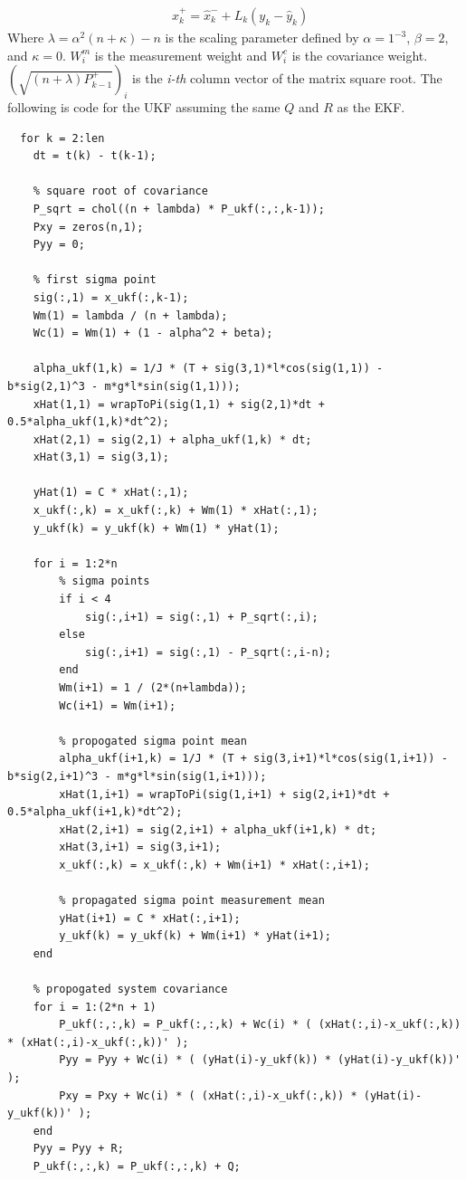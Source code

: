 \documentclass[10pt]{article}
\begin{document}
\begin{enumerate}[label=\textbf{\arabic*.}]
\begin{equation}
\begin{split}
      &\hat{x}_k^+ = \hat{x}_k^- + L_k(y_k - \hat{y}_k)
    \end{split}
    \label{eq:4}
  \end{equation}
  Where $\lambda=\alpha^2(n+\kappa) - n$ is the scaling parameter defined by 
  $\alpha=1^{-3}$, $\beta=2$, and $\kappa=0$. $W_i^{m}$ is the measurement 
  weight and $W_i^{c}$ is the covariance weight. $(\sqrt{(n+\lambda)P_{k-1}^+})_i$ 
  is the \emph{i-th} column vector of the matrix square root. The following is 
  code for the UKF assuming the same $Q$ and $R$ as the EKF.
  \begin{lstlisting}
  for k = 2:len
    dt = t(k) - t(k-1);

    % square root of covariance
    P_sqrt = chol((n + lambda) * P_ukf(:,:,k-1));
    Pxy = zeros(n,1);
    Pyy = 0;

    % first sigma point
    sig(:,1) = x_ukf(:,k-1);
    Wm(1) = lambda / (n + lambda);
    Wc(1) = Wm(1) + (1 - alpha^2 + beta);

    alpha_ukf(1,k) = 1/J * (T + sig(3,1)*l*cos(sig(1,1)) - b*sig(2,1)^3 - m*g*l*sin(sig(1,1)));
    xHat(1,1) = wrapToPi(sig(1,1) + sig(2,1)*dt + 0.5*alpha_ukf(1,k)*dt^2);
    xHat(2,1) = sig(2,1) + alpha_ukf(1,k) * dt;
    xHat(3,1) = sig(3,1);

    yHat(1) = C * xHat(:,1);
    x_ukf(:,k) = x_ukf(:,k) + Wm(1) * xHat(:,1);
    y_ukf(k) = y_ukf(k) + Wm(1) * yHat(1);

    for i = 1:2*n
        % sigma points
        if i < 4
            sig(:,i+1) = sig(:,1) + P_sqrt(:,i);
        else
            sig(:,i+1) = sig(:,1) - P_sqrt(:,i-n);
        end
        Wm(i+1) = 1 / (2*(n+lambda));
        Wc(i+1) = Wm(i+1);

        % propogated sigma point mean
        alpha_ukf(i+1,k) = 1/J * (T + sig(3,i+1)*l*cos(sig(1,i+1)) - b*sig(2,i+1)^3 - m*g*l*sin(sig(1,i+1)));
        xHat(1,i+1) = wrapToPi(sig(1,i+1) + sig(2,i+1)*dt + 0.5*alpha_ukf(i+1,k)*dt^2);
        xHat(2,i+1) = sig(2,i+1) + alpha_ukf(i+1,k) * dt;
        xHat(3,i+1) = sig(3,i+1);
        x_ukf(:,k) = x_ukf(:,k) + Wm(i+1) * xHat(:,i+1);

        % propagated sigma point measurement mean
        yHat(i+1) = C * xHat(:,i+1);
        y_ukf(k) = y_ukf(k) + Wm(i+1) * yHat(i+1);
    end

    % propogated system covariance
    for i = 1:(2*n + 1)
        P_ukf(:,:,k) = P_ukf(:,:,k) + Wc(i) * ( (xHat(:,i)-x_ukf(:,k)) * (xHat(:,i)-x_ukf(:,k))' );
        Pyy = Pyy + Wc(i) * ( (yHat(i)-y_ukf(k)) * (yHat(i)-y_ukf(k))' );
        Pxy = Pxy + Wc(i) * ( (xHat(:,i)-x_ukf(:,k)) * (yHat(i)-y_ukf(k))' );
    end
    Pyy = Pyy + R;
    P_ukf(:,:,k) = P_ukf(:,:,k) + Q;


\end{lstlisting}
\end{enumerate}
\end{document}

